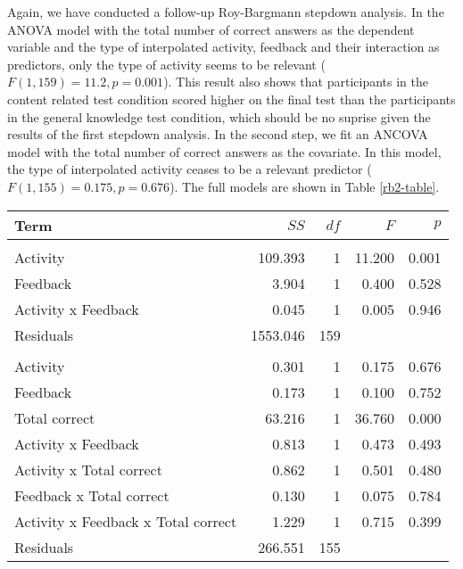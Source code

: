 \documentclass[11pt,]{article}
\begin{document}
Again, we have conducted a follow-up Roy-Bargmann stepdown analysis. In
the ANOVA model with the total number of correct answers as the
dependent variable and the type of interpolated activity, feedback and
their interaction as predictors, only the type of activity seems to be
relevant (\(F(1, 159) = 11.2, p = 0.001\)). This result also shows that
participants in the content related test condition scored higher on the
final test than the participants in the general knowledge test
condition, which should be no suprise given the results of the first
stepdown analysis. In the second step, we fit an ANCOVA model with the
total number of correct answers as the covariate. In this model, the
type of interpolated activity ceases to be a relevant predictor
(\(F(1, 155) = 0.175, p = 0.676\)). The full models are shown in Table
\ref{rb2-table}.

\begin{table*}[t]

\caption{\label{tab:rb2Table}Full ANOVA and ANCOVA models for the second Roy-Bargmann
                     stepdown analysis.\label{rb2-table}}
\centering
\begin{tabular}{lrrrr}
\toprule
Term & $SS$ & $df$ & $F$ & $p$\\
\midrule
\addlinespace[0.3em]
\multicolumn{5}{l}{\textbf{ANOVA}}\\
\hspace{1em}Activity & 109.393 & 1 & 11.200 & 0.001\\
\hspace{1em}Feedback & 3.904 & 1 & 0.400 & 0.528\\
\hspace{1em}Activity x Feedback & 0.045 & 1 & 0.005 & 0.946\\
\hspace{1em}Residuals & 1553.046 & 159 &  & \\
\addlinespace[0.3em]
\multicolumn{5}{l}{\textbf{ANCOVA}}\\
\hspace{1em}Activity & 0.301 & 1 & 0.175 & 0.676\\
\hspace{1em}Feedback & 0.173 & 1 & 0.100 & 0.752\\
\hspace{1em}Total correct & 63.216 & 1 & 36.760 & 0.000\\
\hspace{1em}Activity x Feedback & 0.813 & 1 & 0.473 & 0.493\\
\hspace{1em}Activity x Total correct & 0.862 & 1 & 0.501 & 0.480\\
\hspace{1em}Feedback x Total correct & 0.130 & 1 & 0.075 & 0.784\\
\hspace{1em}Activity x Feedback x Total correct & 1.229 & 1 & 0.715 & 0.399\\
\hspace{1em}Residuals & 266.551 & 155 &  & \\
\bottomrule
\end{tabular}
\end{table*}
\end{document}
